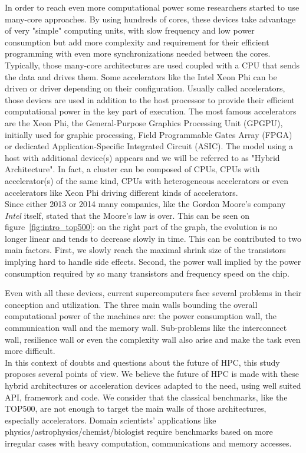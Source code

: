 \documentclass[12pt,a4paper]{report}
\begin{document}
In order to reach even more computational power some researchers started to use many-core approaches. 
By using hundreds of cores, these devices take advantage of very "simple" computing units, with slow frequency and low power consumption but add more complexity and requirement for their efficient programming with even more synchronizations needed between the cores. 
Typically, those many-core architectures are used coupled with a CPU that sends the data and drives them.
Some accelerators like the Intel Xeon Phi can be driven or driver depending on their configuration. 
Usually called accelerators, those devices are used in addition to the host processor to provide their efficient computational power in the key part of execution. 
The most famous accelerators are the Xeon Phi, the General-Purpose Graphics Processing Unit (GPGPU), initially used for graphic processing, Field Programmable Gates Array (FPGA) or dedicated Application-Specific Integrated Circuit (ASIC).
The model using a host with additional device(s) appears and we will be referred to as "Hybrid Architecture".
In fact, a cluster can be composed of CPUs, CPUs with accelerator(s) of the same kind, CPUs with heterogeneous accelerators or even accelerators like Xeon Phi driving different kinds of accelerators.\\

Since either 2013 or 2014 many companies, like the Gordon Moore's company \textit{Intel} itself, stated that the Moore's law is over. 
This can be seen on figure~\ref{fig:intro_top500}: on the right part of the graph, the evolution is no longer linear and tends to decrease slowly in time. 
This can be contributed to two main factors. 
First, we slowly reach the maximal shrink size of the transistors implying hard to handle side effects. 
Second, the power wall implied by the power consumption required by so many transistors and frequency speed on the chip.

Even with all these devices, current supercomputers face several problems in their conception and utilization. 
The three main walls bounding the overall computational power of the machines are: the power consumption wall, the communication wall and the memory wall.  
Sub-problems like the interconnect wall, resilience wall or even the complexity wall also arise and make the task even more difficult.\\

In this context of doubts and questions about the future of HPC, this study proposes several points of view. 
We believe the future of HPC is made with these hybrid architectures or acceleration devices adapted to the need, using well suited API, framework and code.
We consider that the classical benchmarks, like the TOP500, are not enough to target the main walls of those architectures, especially accelerators. 
Domain scientists’ applications like physics/astrophysics/chemist/biologist require benchmarks based on more irregular cases with heavy computation, communications and memory accesses. 
\end{document}
